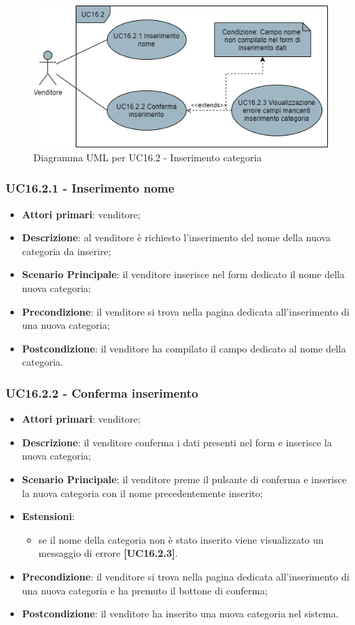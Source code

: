 \begin{figure}[H]
\centering
\includegraphics[scale=0.6]{res/UseCase/Immagini/InserimentoCategoria}
\caption{Diagramma UML per UC16.2 - Inserimento categoria}
\end{figure}

\subsubsection{UC16.2.1 - Inserimento nome}
\begin{itemize}
\item \textbf{Attori primari}: venditore;
\item \textbf{Descrizione}: al venditore è richiesto l'inserimento del nome della nuova categoria da inserire;
\item \textbf{Scenario Principale}: il venditore inserisce nel form dedicato il nome della nuova categoria;
\item \textbf{Precondizione}: il venditore si trova nella pagina dedicata all'inserimento di una nuova categoria;
\item \textbf{Postcondizione}: il venditore ha compilato il campo dedicato al nome della categoria.
\end{itemize}

\subsubsection{UC16.2.2 - Conferma inserimento}
\begin{itemize}
\item \textbf{Attori primari}: venditore;
\item \textbf{Descrizione}: il venditore conferma i dati presenti nel form e inserisce la nuova categoria;
\item \textbf{Scenario Principale}: il venditore preme il pulsante di conferma e inserisce la nuova categoria con il nome precedentemente inserito;
\item \textbf{Estensioni}: 
\begin{itemize}
	\item se il nome della categoria non è stato inserito viene visualizzato un messaggio di errore \textbf{[UC16.2.3]}.
\end{itemize} 
\item \textbf{Precondizione}: il venditore si trova nella pagina dedicata all'inserimento di una nuova categoria e ha premuto il bottone di conferma;
\item \textbf{Postcondizione}: il venditore ha inserito una nuova categoria nel sistema.
\end{itemize}

